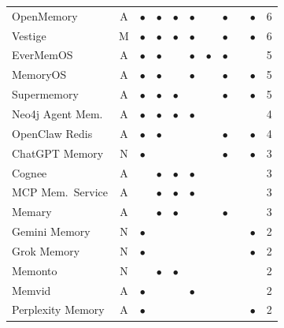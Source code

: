 \begin{table}[!t]
\begin{tabular}{@{}lc cccccccc r@{}}
OpenMemory           & A & $\bullet$ & $\bullet$ & $\bullet$ & $\bullet$ &           & $\bullet$ &           & $\bullet$ & 6 \\
Vestige              & M & $\bullet$ & $\bullet$ & $\bullet$ & $\bullet$ &           & $\bullet$ &           & $\bullet$ & 6 \\
EverMemOS            & A & $\bullet$ & $\bullet$ &           & $\bullet$ & $\bullet$ & $\bullet$ &           &           & 5 \\
MemoryOS             & A & $\bullet$ & $\bullet$ &           & $\bullet$ &           & $\bullet$ &           & $\bullet$ & 5 \\
Supermemory          & A & $\bullet$ & $\bullet$ & $\bullet$ &           &           & $\bullet$ &           & $\bullet$ & 5 \\
Neo4j Agent Mem.     & A & $\bullet$ & $\bullet$ & $\bullet$ & $\bullet$ &           &           &           &           & 4 \\
OpenClaw Redis       & A & $\bullet$ & $\bullet$ &           &           &           & $\bullet$ &           & $\bullet$ & 4 \\
ChatGPT Memory       & N & $\bullet$ &           &           &           &           & $\bullet$ &           & $\bullet$ & 3 \\
Cognee               & A &           & $\bullet$ & $\bullet$ & $\bullet$ &           &           &           &           & 3 \\
MCP Mem.\ Service    & A &           & $\bullet$ & $\bullet$ & $\bullet$ &           &           &           &           & 3 \\
Memary               & A &           & $\bullet$ & $\bullet$ &           &           & $\bullet$ &           &           & 3 \\
Gemini Memory        & N & $\bullet$ &           &           &           &           &           &           & $\bullet$ & 2 \\
Grok Memory          & N & $\bullet$ &           &           &           &           &           &           & $\bullet$ & 2 \\
Memonto              & N &           & $\bullet$ & $\bullet$ &           &           &           &           &           & 2 \\
Memvid               & A & $\bullet$ &           &           & $\bullet$ &           &           &           &           & 2 \\
Perplexity Memory    & A & $\bullet$ &           &           &           &           &           &           & $\bullet$ & 2 \\

\end{tabular}
\end{table}
